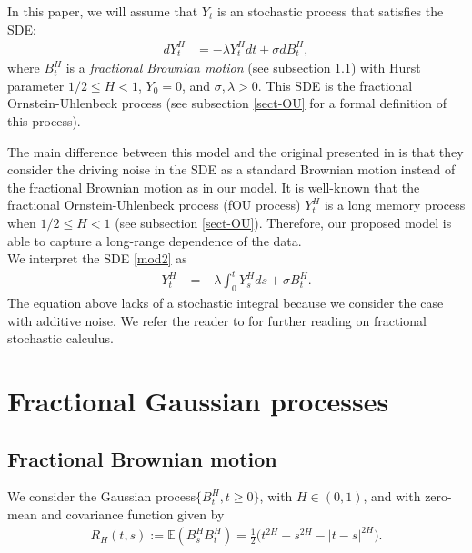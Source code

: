 \documentclass[smallextended]{svjour3}
\newcommand{\E}{\mathbb{E}}
\begin{document}
In this paper, we will assume that $Y_t$ is an stochastic process that satisfies the SDE:
\begin{align}
	dY_t^H&=-\lambda Y_t^Hdt+\sigma dB_t^H, \label{mod2}
\end{align}
where $B_t^H $ is a \emph{fractional Brownian motion} (see subsection \ref{fBm})
     with Hurst parameter $1/2 \le H< 1$,  $Y_0=0$, and
$\sigma,\lambda> 0$.
This SDE is the fractional Ornstein-Uhlenbeck process (see subsection \ref{sect-OU} for a formal definition of this process). 



The main difference between this model and the original presented
in \cite{mi-pr} is that they consider the driving noise in the SDE as a standard
Brownian motion instead of the fractional Brownian motion as in our model. It is well-known that the fractional Ornstein-Uhlenbeck process (fOU process) $ Y_t^H$ is a long memory process when $1/2 \le H< 1$ (see subsection \ref{sect-OU}). Therefore, our proposed model is able to capture a long-range dependence of the data.\\



We interpret the SDE \eqref{mod2} as
\begin{align}
	Y_t^H&=-\lambda\int_0^t Y_s^Hds+\sigma B_t^H.\label{mod3}
\end{align}
The equation above lacks of a stochastic integral because we
consider the case with additive noise.  We refer the reader to \cite{mi} for further reading on fractional stochastic calculus.


\section{Fractional Gaussian processes} \label{fgn}

\subsection{Fractional Brownian motion} \label{fBm}

        We consider the Gaussian process$\{B_t^H,t\ge 0\}$, with $H\in (0,1)$,
    and with zero-mean and covariance function given by
    \begin{align}
        R_H(t,s):=
            \E(
                B_s^H B_t^H
            )
            =
            \tfrac{1}{2}
            \big(
                t ^ {2 H} + s ^ {2 H}
                - |t - s| ^ {2 H}
            \big).\label{s1.1}
    \end{align}
\end{document}
